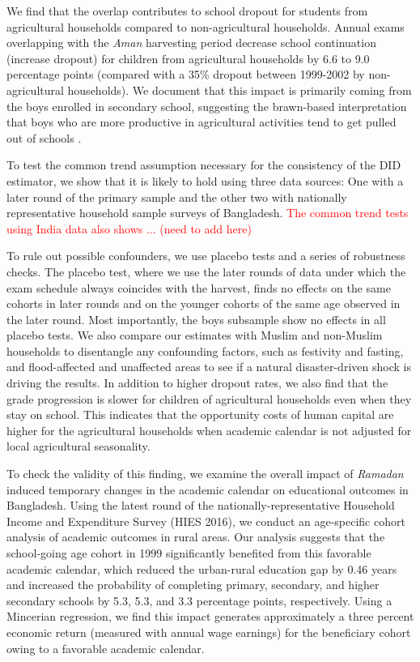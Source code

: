 \documentclass[12pt,letterpaper]{article}\usepackage[margin=1in]{geometry}
\newcommand{\SAdded}[1]{\textcolor{red}{#1}}
\newcommand{\0}{\ensuremath{\mbox{\boldmath $0$}}}
\begin{document}
We find that the overlap contributes to school dropout for students from agricultural households compared to non-agricultural households. Annual exams overlapping with the \textit{Aman} harvesting period decrease school continuation (increase dropout) for children from agricultural households by 6.6 to 9.0 percentage points (compared with a 35\% dropout between 1999-2002 by non-agricultural households). We document that this impact is primarily coming from the boys enrolled in secondary school, suggesting the brawn-based interpretation that boys who are more productive in agricultural activities tend to get pulled out of schools \citep{PittRosenzweigHassan2010}. 

To test the common trend assumption necessary for the consistency of the DID estimator, we show that it is likely to hold using three data sources: One with a later round of the primary sample and the other two with nationally representative household sample surveys of Bangladesh. \SAdded{The common trend tests using India data also shows ... (need to add here)}

To rule out possible confounders, we use placebo tests and a series of robustness checks. The placebo test, where we use the later rounds of data under which the exam schedule always coincides with the harvest, finds no effects on the same cohorts in later rounds and on the younger cohorts of the same age observed in the later round. Most importantly, the boys subsample show no effects in all placebo tests. We also compare our estimates with Muslim and non-Muslim households to disentangle any confounding factors, such as festivity and fasting, and flood-affected and unaffected areas to see if a natural disaster-driven shock is driving the results. In addition to higher dropout rates, we also find that the grade progression is slower for children of agricultural households even when they stay on school. This indicates that the opportunity costs of human capital are higher for the agricultural households when academic calendar is not adjusted for local agricultural seasonality. 

To check the validity of this finding, we examine the overall impact of \textit{Ramadan} induced temporary changes in the academic calendar on educational outcomes in Bangladesh. Using the latest round of the nationally-representative Household Income and Expenditure Survey (HIES 2016), we conduct an age-specific cohort analysis of academic outcomes in rural areas. Our analysis suggests that the school-going age cohort in 1999 significantly benefited from this favorable academic calendar, which reduced the urban-rural education gap by 0.46 years and increased the probability of completing primary, secondary, and higher secondary schools by 5.3, 5.3, and 3.3 percentage points, respectively. Using a Mincerian regression, we find this impact generates approximately a three percent economic return (measured with annual wage earnings) for the beneficiary cohort owing to a favorable academic calendar.
\end{document}
